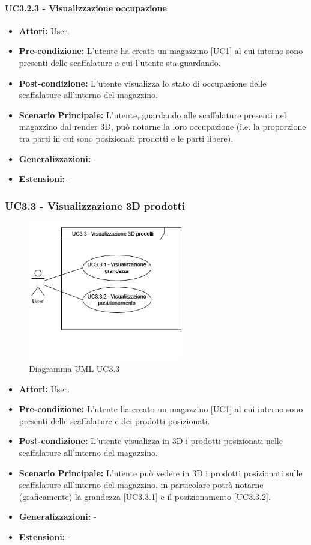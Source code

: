 \paragraph{UC3.2.3 - Visualizzazione occupazione}
\begin{itemize}
    \item \textbf{Attori:} User.
    \item \textbf{Pre-condizione:} L'utente ha creato un magazzino [UC1] al cui interno sono presenti delle scaffalature a cui l'utente sta guardando.
    \item \textbf{Post-condizione:} L'utente visualizza lo stato di occupazione delle scaffalature all'interno del magazzino.
    \item \textbf{Scenario Principale:}  L'utente, guardando alle scaffalature presenti nel magazzino dal render 3D, può notarne la loro occupazione (i.e. la proporzione tra parti in cui sono posizionati prodotti e le parti libere).
    \item \textbf{Generalizzazioni:} -
    \item \textbf{Estensioni:} -
\end{itemize}


\subsubsection{UC3.3 - Visualizzazione 3D prodotti}
\begin{figure}[H]
  \centering
  \includegraphics[width=0.6\textwidth]{UC_diagrams_1-10/UC3.3.drawio.png}
   \caption{Diagramma UML UC3.3}
\end{figure}
\begin{itemize}
    \item \textbf{Attori:} User.
    \item \textbf{Pre-condizione:}  L'utente ha creato un magazzino [UC1] al cui interno sono presenti delle scaffalature e dei prodotti posizionati.
    \item \textbf{Post-condizione:} L'utente visualizza in 3D i prodotti posizionati nelle scaffalature all'interno del magazzino.
    \item \textbf{Scenario Principale:}  L'utente può vedere in 3D i prodotti posizionati sulle scaffalature all'interno del magazzino, in particolare potrà notarne (graficamente) la grandezza [UC3.3.1] e il posizionamento [UC3.3.2].
    \item \textbf{Generalizzazioni:} -
    \item \textbf{Estensioni:} -
\end{itemize}


